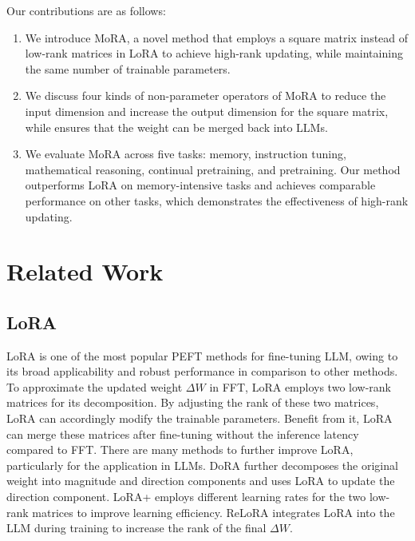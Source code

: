 \documentclass[11pt]{article}
\begin{document}
Our contributions are as follows:

\begin{enumerate}
\item We introduce MoRA, a novel method that employs a square matrix instead of low-rank matrices in LoRA to achieve high-rank updating, while maintaining the same number of trainable parameters.
\item  We discuss four kinds of non-parameter operators of MoRA to reduce the input dimension and increase the output dimension for the square matrix, while ensures that the weight can be merged back into LLMs.
\item
  We evaluate MoRA across five tasks: memory, instruction tuning, mathematical reasoning, continual pretraining, and pretraining. Our method outperforms LoRA on memory-intensive tasks and achieves comparable performance on other tasks, which demonstrates the effectiveness of high-rank updating.
\end{enumerate}


\section{Related Work}
\subsection{LoRA}
LoRA is one of the most popular PEFT methods for fine-tuning LLM, owing to its broad applicability and robust performance in comparison to other methods.
To approximate the updated weight $\Delta W$ in FFT, LoRA employs two low-rank matrices for its decomposition. By adjusting the rank of these two matrices, LoRA can accordingly modify the trainable parameters. Benefit from it, LoRA can merge these matrices after fine-tuning without the inference latency compared to FFT.
There are many methods to further improve LoRA, particularly for the application in LLMs. %
DoRA\cite{liu2024dora} further decomposes the original weight into magnitude and direction components and uses LoRA to update the direction component. LoRA+\cite{Hayou2024} employs different learning rates for the two low-rank matrices to improve learning efficiency. ReLoRA\cite{lialin2023stack} integrates LoRA into the LLM during training to increase the rank of the final $\Delta W$.
\end{document}
